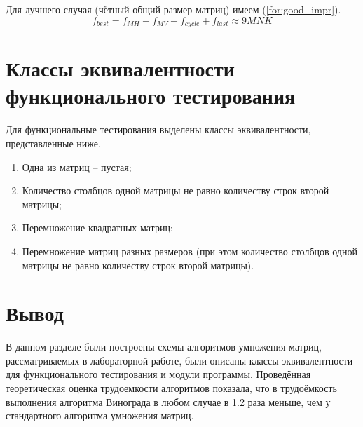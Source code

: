 Для лучшего случая (чётный общий размер матриц) имеем (\ref{for:good_impr}).
\begin{equation}
	\label{for:good_impr}
	f_{best} = f_{MH} + f_{MV} + f_{cycle} + f_{last} \approx 9MNK
\end{equation}


\section{Классы эквивалентности функционального тестирования}

Для функциональные тестирования выделены классы эквивалентности, представленные ниже.

\begin{enumerate}
	\item Одна из матриц -- пустая;
	\item Количество столбцов одной матрицы не равно количеству строк второй матрицы;
	\item Перемножение квадратных матриц;
	\item Перемножение матриц разных размеров (при этом количество столбцов одной матрицы не равно количеству строк второй матрицы).
\end{enumerate}


\section*{Вывод}

В данном разделе были построены схемы алгоритмов умножения матриц, рассматриваемых в лабораторной работе, были описаны классы эквивалентности для функционального тестирования и модули программы.
Проведённая теоретическая оценка трудоемкости алгоритмов показала, что в трудоёмкость выполнения алгоритма Винограда в любом случае в 1.2 раза меньше, чем у стандартного алгоритма умножения матриц.
